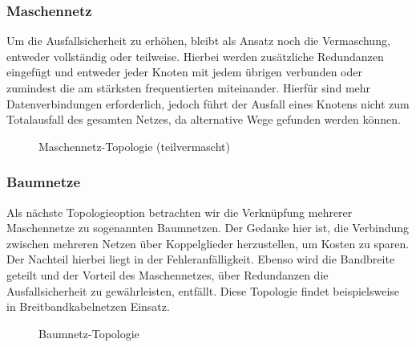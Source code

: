 \documentclass[11pt,a4paper]{scrartcl}
\begin{document}
\subsubsection{Maschennetz}
Um die Ausfallsicherheit zu erhöhen, bleibt als Ansatz noch die Vermaschung, entweder vollständig oder teilweise. Hierbei werden zusätzliche Redundanzen eingefügt und entweder jeder Knoten mit jedem übrigen verbunden oder zumindest die am stärksten frequentierten miteinander. Hierfür sind mehr Datenverbindungen erforderlich, jedoch führt der Ausfall eines Knotens nicht zum Totalausfall des gesamten Netzes, da alternative Wege gefunden werden können.
\begin{figure}[h]
\centering
{}
\caption{Maschennetz-Topologie (teilvermascht)}
\end{figure}
\subsubsection{Baumnetze}
Als nächste Topologieoption betrachten wir die Verknüpfung mehrerer Maschennetze zu sogenannten Baumnetzen. Der Gedanke hier ist, die Verbindung zwischen mehreren Netzen über Koppelglieder herzustellen, um Kosten zu sparen. Der Nachteil hierbei liegt in der Fehleranfälligkeit. Ebenso wird die Bandbreite geteilt und der Vorteil des Maschennetzes, über Redundanzen die Ausfallsicherheit zu gewährleisten, entfällt. Diese Topologie findet beispielsweise in Breitbandkabelnetzen Einsatz.
\begin{figure}[h]
\centering
{}
\caption{Baumnetz-Topologie}
\end{figure}
\end{document}
